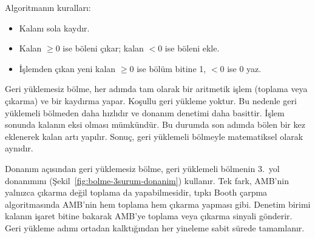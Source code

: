 Algoritmanın kuralları:
\begin{itemize}[nosep]
    \item Kalanı sola kaydır.
    \item Kalan $\geq 0$ ise böleni çıkar; kalan $< 0$ ise böleni ekle.
    \item İşlemden çıkan yeni kalan $\geq 0$ ise bölüm bitine 1, $< 0$ ise 0 yaz.
\end{itemize}

Geri yüklemesiz bölme, her adımda tam olarak bir aritmetik işlem (toplama veya çıkarma) ve bir kaydırma yapar. Koşullu geri yükleme yoktur. Bu nedenle geri yüklemeli bölmeden daha hızlıdır ve donanım denetimi daha basittir. İşlem sonunda kalanın eksi olması mümkündür. Bu durumda son adımda bölen bir kez eklenerek kalan artı yapılır. Sonuç, geri yüklemeli bölmeyle matematiksel olarak aynıdır.

Donanım açısından geri yüklemesiz bölme, geri yüklemeli bölmenin 3.\ yol donanımını (Şekil~\ref{fig:bolme-3surum-donanim}) kullanır. Tek fark, AMB'nin yalnızca çıkarma değil toplama da yapabilmesidir, tıpkı Booth çarpma algoritmasında AMB'nin hem toplama hem çıkarma yapması gibi. Denetim birimi kalanın işaret bitine bakarak AMB'ye toplama veya çıkarma sinyali gönderir. Geri yükleme adımı ortadan kalktığından her yineleme sabit sürede tamamlanır.

